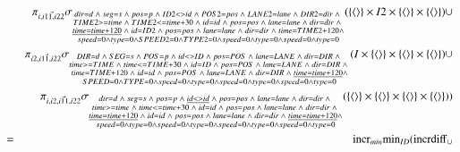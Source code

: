 \begin{eqnarray*}
&& \pi_{\vec{i, i11, i22}}\sigma_{\substack{dir = d \;\wedge\; seg = s \;\wedge\; pos = p \;\wedge\; ID2 <> id \;\wedge\; POS2 = pos \;\wedge\; LANE2 = lane \;\wedge\; DIR2 = dir \;\wedge\; \\ TIME2 >= time \;\wedge\; TIME2 <= time + 30 \;\wedge\; id = id \;\wedge\; pos = pos \;\wedge\;  lane = lane \;\wedge\; dir =dir \;\wedge\; \\\underline {time = time + 120} \;\wedge\; id = ID2 \;\wedge\; pos = pos \;\wedge\;  lane = lane \;\wedge\; dir = dir \;\wedge\; time = TIME2 + 120 \wedge \\speed = 0 \wedge type = 0 \wedge SPEED2 = 0 \wedge TYPE2 = 0 \wedge  speed = 0 \wedge type = 0 \wedge speed = 0 \wedge type =0 }}( \{\tuple{} \} \times I2 \times \{\tuple{} \} \times \{\tuple{} \} ) \cup \\
&& \pi_{\vec{i2, i11, i22}}\sigma_{\substack{DIR = d \;\wedge\; SEG = s \;\wedge\; POS = p \;\wedge\; id <> ID \;\wedge\; pos = POS \;\wedge\; lane = LANE \;\wedge\; dir = DIR \;\wedge\; \\ time >= TIME \;\wedge\; time <= TIME + 30 \;\wedge\; id = ID \;\wedge\; pos = POS \;\wedge\;  lane = LANE \;\wedge\; dir=DIR \;\wedge\; \\time = TIME + 120 \;\wedge\; id = id \;\wedge\; pos = POS \;\wedge\;  lane = LANE \;\wedge\; dir = DIR \;\wedge\; \underline { time = time + 120} \wedge \\SPEED = 0 \wedge TYPE = 0 \wedge speed = 0 \wedge type = 0 \wedge  speed = 0 \wedge type = 0 \wedge speed = 0 \wedge type =0 }}(I \times \{\tuple{} \} \times \{\tuple{} \} \times  \{\tuple{} \}) \cup \\
&& \pi_{\vec{i, i2, i11, i22}}\sigma_{\substack{dir = d \;\wedge\; seg = s \;\wedge\; pos = p \;\wedge\; \underline {id <> id} \;\wedge\; pos= pos \;\wedge\; lane = lane \;\wedge\; dir = dir \;\wedge\; \\ time >= time \;\wedge\; time <= time + 30 \;\wedge\; id = id \;\wedge\; pos = pos \;\wedge\;  lane = lane \;\wedge\; dir=dir \;\wedge\; \\\underline {time = time + 120} \;\wedge\; id = id \;\wedge\; pos = pos \;\wedge\;  lane = lane \;\wedge\; dir = dir \;\wedge\; \underline {time = time + 120} \wedge \\speed = 0 \wedge type = 0 \wedge speed = 0 \wedge type = 0 \wedge  speed = 0 \wedge type = 0 \wedge speed = 0 \wedge type =0 }}( \{\tuple{} \} \times \{\tuple{} \} \times \{\tuple{} \} \times \{\tuple{} \} )) \\
&=& \algincr_{min} \algmin_{ID} (\algincrdiff_{\cup} \\

\end{eqnarray*}
